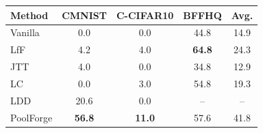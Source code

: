 \begin{tabular}{lcccc}
\toprule
Method & CMNIST & C-CIFAR10 & BFFHQ & Avg. \\
\midrule
Vanilla & 0.0 & 0.0 & 44.8 & 14.9 \\
LfF & 4.2 & 4.0 & \textbf{64.8} & 24.3 \\
JTT & 4.0 & 0.0 & 34.8 & 12.9 \\
LC & 0.0 & 3.0 & 54.8 & 19.3 \\
LDD & 20.6 & 0.0 & -- & -- \\
\rowcolor{ours}PoolForge & \textbf{56.8} & \textbf{11.0} & 57.6 & 41.8 \\
\bottomrule
\end{tabular}
